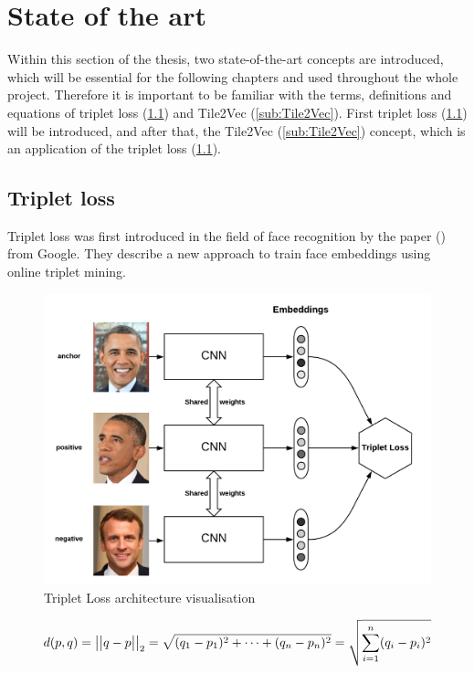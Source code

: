 \section{State of the art}
\label{sec:State-of-art}
Within this section of the thesis, two state-of-the-art concepts are introduced, which will be essential for the following chapters and used throughout the whole project. Therefore it is important to be familiar with the terms, definitions and equations of triplet loss (\ref{sub:Triplet-Loss}) and Tile2Vec (\ref{sub:Tile2Vec}). First triplet loss (\ref{sub:Triplet-Loss}) will be introduced, and after that, the Tile2Vec (\ref{sub:Tile2Vec}) concept, which is an application of the triplet loss (\ref{sub:Triplet-Loss}).

\subsection{Triplet loss}
\label{sub:Triplet-Loss}
Triplet loss was first introduced in the field of face recognition by the paper (\cite{schroff_facenet_2015}) from Google. They describe a new approach to train face embeddings using online triplet mining.
\begin{figure}[htbp]
	\centering
	\includegraphics[scale=0.35]{img/Triplet_Loss_Architecture.png}
	\caption[Triplet Loss architecture visualisation]{Triplet Loss architecture visualisation\footnotemark}
	\label{fig:Triplet-Loss-Architecture}
\end{figure}
\noindent
{}
\begin{equation}
    \centering
    \begin{gathered}
        d(p,q) = \big|\big|q-p\big|\big|_2 = \sqrt{(q_1 - p_1)^2 + \dots + (q_n - p_n)^2} = \sqrt{\sum_{i=1}^n (q_i - p_i)^2}
    \end{gathered}
    \label{eq:Euclidean-Distance}
\end{equation}
